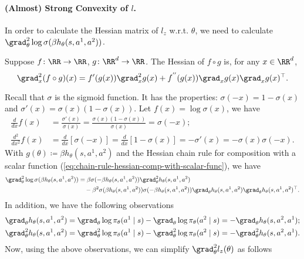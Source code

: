 \paragraph{(Almost) Strong Convexity of $l$.} In order to calculate the Hessian matrix of $l_z$ w.r.t. $\theta$, we need to calculate $\grad^2_\theta \log\sigma(\beta h_\theta(s,a^1,a^2))$.

Suppose $f\colon\RR\to\RR$, $g\colon\RR^d\to\RR$. The Hessian of $f\circ g$ is, for any $x\in\RR^d$,
\begin{equation}\label{eq:chain-rule-hessian-comp-with-scalar-func}
    \grad_x^2(f\circ g)(x) = f'(g(x))\grad_x^2 g(x) + f^{''}(g(x))\grad_x g(x)\grad_x g(x)^{\top}.
\end{equation}

Recall that $\sigma$ is the sigmoid function. It has the properties: $\sigma(-x)=1-\sigma(x)$ and $\sigma'(x)=\sigma(x)(1-\sigma(x))$. Let $f(x) = \log\sigma(x)$, we have
\begin{align*}
    \frac{d}{dx}f(x) &= \frac{\sigma'(x)}{\sigma(x)} = \frac{\sigma(x)(1-\sigma(x))}{\sigma(x)} = \sigma(-x);\\
    \frac{d^2}{dx^2}f(x) &= \frac{d}{dx}[\sigma(-x)] = \frac{d}{dx}[1-\sigma(x)] = -\sigma'(x) = -\sigma(x)\sigma(-x).
\end{align*}
With $g(\theta)\coloneqq \beta h_\theta(s,a^1,a^2)$ and the Hessian chain rule for composition with a scalar function (\cref{eq:chain-rule-hessian-comp-with-scalar-func}), we have
\begin{align*}
    \grad_\theta^2\log\sigma(\beta h_\theta(s,a^1,a^2))&=\beta\sigma(-\beta h_\theta(s,a^1,a^2))\grad_\theta^2 h_\theta(s,a^1,a^2) \\
    &\quad- \beta^2\sigma(\beta h_\theta(s,a^1,a^2))\sigma(-\beta h_\theta(s,a^1,a^2))\grad_\theta h_\theta(s,a^1,a^2)\grad_\theta h_\theta(s,a^1,a^2)^{\top}.
\end{align*}
In addition, we have the following observations
\begin{align*}
    \grad_\theta h_\theta(s,a^1,a^2) &= \grad_\theta\log\pi_\theta(a^1\mid s) - \grad_\theta\log\pi_\theta(a^2\mid s) = -\grad_\theta h_\theta(s,a^2,a^1);\\
    \grad_\theta^2 h_\theta(s,a^1,a^2)  &= \grad_\theta^2\log\pi_\theta(a^1\mid s) - \grad_\theta^2\log\pi_\theta(a^2\mid s) = -\grad_\theta^2 h_\theta(s,a^2,a^1).
\end{align*}
Now, using the above observations, we can simplify $\grad_\theta^2 l_z(\theta)$ as follows
